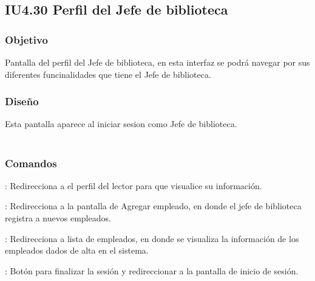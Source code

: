 \newpage
\subsection{IU4.30 Perfil del Jefe de biblioteca}

\subsubsection{Objetivo}
	Pantalla del perfil del Jefe de biblioteca, en esta interfaz se podrá navegar por sus diferentes funcinalidades que tiene el Jefe de biblioteca.  

\subsubsection{Diseño}
	Esta pantalla aparece al iniciar sesion como Jefe de biblioteca.  \\\\



\subsubsection{Comandos}
	\begin{Citemize}
		\item {}: Redirecciona a el perfil del lector para que visualice su información. 
		\item {}: Redirecciona a la pantalla de Agregar empleado, en donde el jefe de biblioteca registra a nuevos empleados.
		\item {}: Redirecciona a lista de empleados, en donde se visualiza la información de los empleados dados de alta en el sistema.
		\item {}: Botón para finalizar la sesión y redireccionar a la pantalla de inicio de sesión.
	\end{Citemize}